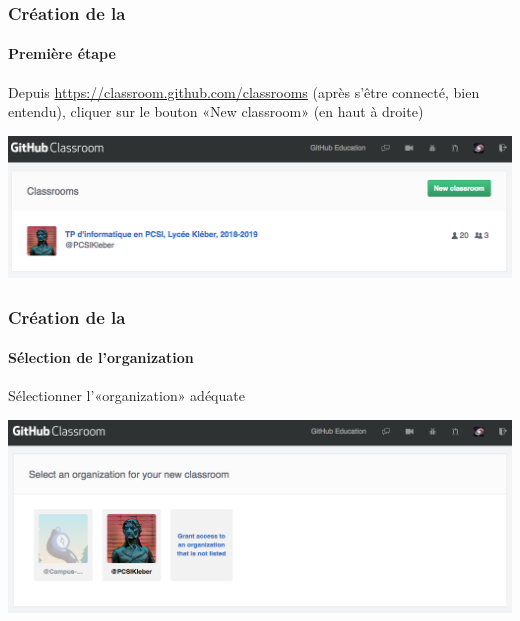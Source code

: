 \begin{frame}
	\frametitle{Création de la }
	\framesubtitle{Première étape}

	Depuis \url{https://classroom.github.com/classrooms} (après s'être connecté, bien entendu), cliquer sur le bouton «New classroom» (en haut à droite)

	\begin{center}
		\includegraphics[width=\linewidth]{figures/classroom_new_classroom.png}
	\end{center}

\end{frame}

\begin{frame}
	\frametitle{Création de la }
	\framesubtitle{Sélection de l'organization}

	Sélectionner l'«organization» adéquate

	\begin{center}
		\includegraphics[width=\linewidth]{figures/classroom_select_organization.png}
	\end{center}

\end{frame}

